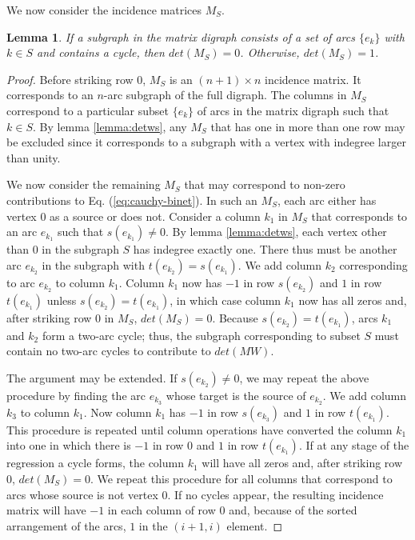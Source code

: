 \documentclass{article}
\newtheorem{lemma}{Lemma}
\begin{document}
We now consider the incidence matrices $M_S$.
\begin{lemma}
If a subgraph in the matrix digraph consists of a set of
arcs $\{e_k\}$ with $k \in S$ and
contains a cycle,
then $det(M_S) = 0$.  Otherwise, $det(M_S) = 1$.
\label{lemma:detms}
\end{lemma}

\begin{proof}
Before striking row $0$, $M_S$ is an $(n + 1) \times n$ incidence matrix.
It corresponds to an $n$-arc subgraph of the full digraph.
The columns in $M_S$ correspond to a particular subset $\{e_k\}$ of
arcs in the matrix digraph such that $k \in S$.  By lemma \ref{lemma:detws},
any $M_S$ that
has one in more than one row may be excluded since it corresponds to
a subgraph with a vertex with indegree larger than unity.

We now consider
the remaining $M_S$ that may correspond to non-zero contributions to
Eq. (\ref{eq:cauchy-binet}).  In such an $M_S$,
each arc either has vertex $0$ as a source
or does not.
Consider a column $k_1$ in $M_S$ that corresponds
to an arc $e_{k_1}$ such that $s(e_{k_1}) \neq 0$.  By lemma \ref{lemma:detws},
each vertex other than $0$ in the subgraph $S$ has indegree exactly
one. There thus must be another arc $e_{k_2}$ in the subgraph with 
$t(e_{k_2}) = s( e_{k_1} )$.  We add column $k_2$ corresponding to
arc $e_{k_2}$ to column $k_1$.  Column $k_1$
now has $-1$ in row $s(e_{k_2})$ and
$1$ in row $t(e_{k_1})$ unless $s(e_{k_2}) = t(e_{k_1})$, in which
case column $k_1$ now has all zeros and,
after striking row $0$ in $M_S$, $det(M_S) = 0$.
Because $s(e_{k_2}) = t(e_{k_1})$, arcs $k_1$ and $k_2$ form a two-arc
cycle; thus, the subgraph corresponding to subset $S$ must contain
no two-arc cycles to contribute to $det(MW)$.

The argument may be extended.
If $s(e_{k_2}) \neq 0$, we may repeat the above procedure by
finding the arc $e_{k_3}$ whose target is the source of $e_{k_2}$.  We add
column $k_3$ to column $k_1$.  Now column $k_1$ has $-1$ in row
$s(e_{k_3})$ and $1$ in row $t(e_{k_1})$.  This procedure is repeated
until column operations have converted
the column $k_1$ into one in which there is
$-1$ in row $0$ and $1$ in row $t(e_{k_1})$.  If at any stage of
the regression a cycle forms, the column $k_1$
will have all zeros and, after striking row $0$, $det(M_S) = 0$.
We repeat this procedure for all columns that correspond to
arcs whose source is not vertex $0$.  If no cycles appear,
the resulting incidence matrix will have $-1$ in each column of
row $0$ and, because of the sorted arrangement of the arcs, $1$
in the $(i+1,i)$ element.


\end{proof}
\end{document}
